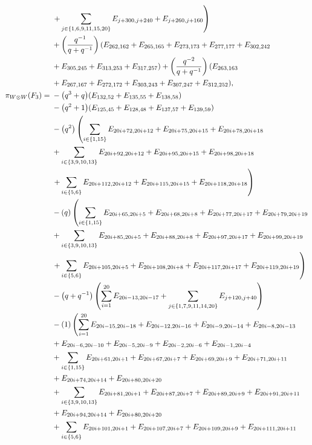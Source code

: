 \documentclass[pdftex]{sigma}
\numberwithin{equation}{section}
\theoremstyle{definition}
\begin{document}
\begin{align*}
&\left. + \sum_{j \in \{1,6,9,11,15,20\}} E_{j+300,j+240} + E_{j+260,j+160} \right) \\
&+\left(\frac{q^{-1}}{q + q^{-1}}\right)(E_{262,162}+E_{265,165}+E_{273,173}+E_{277,177}+E_{302,242}\\
&+E_{305,245}+E_{313,253}+E_{317,257})+\left(\frac{q^{-2}}{q + q^{-1}}\right)(E_{263,163}\\
&+E_{267,167}+E_{272,172}+E_{303,243}+E_{307,247}+E_{312,252}),
\\
 \pi_{W \otimes W}(F_3) ={}&
-\bigl(q^3 + q\bigr)(E_{132,52}+E_{135,55}+E_{138,58})\\
&-\bigl(q^2 + 1\bigr)(E_{125,45}+E_{128,48}+E_{137,57}+E_{139,59})\\
&-\bigl(q^2\bigr)\left( \sum_{i \in \{1,15\}} E_{20i+72,20i+12} + E_{20i+75,20i+15} + E_{20i+78,20i+18} \right.\\
&+ \sum_{i \in \{3,9,10,13\}} E_{20i+92,20i+12} + E_{20i+95,20i+15} + E_{20i+98,20i+18} \\
&\left.+ \sum_{i \in \{5,6\}} E_{20i+112,20i+12} + E_{20i+115,20i+15} + E_{20i+118,20i+18} \right)\\
&-(q)\left( \sum_{i \in \{1,15\}} E_{20i+65,20i+5} + E_{20i+68,20i+8} + E_{20i+77,20i+17} + E_{20i+79,20i+19} \right.\\
&+ \sum_{i \in \{3,9,10,13\}} E_{20i+85,20i+5} + E_{20i+88,20i+8} + E_{20i+97,20i+17} + E_{20i+99,20i+19} \\
&\left. + \sum_{i \in \{5,6\}} E_{20i+105,20i+5} + E_{20i+108,20i+8} + E_{20i+117,20i+17} + E_{20i+119,20i+19} \right)\\
&-\bigl(q+q^{-1}\bigr)\left( \sum_{i=1}^{20} E_{20i-13,20i-17} \vphantom{\sum_{j \in \{1,7,9,11,14,20\}}} + \sum_{j \in \{1,7,9,11,14,20\}} E_{j+120,j+40} \right)\\
&-(1)\left( \sum_{i=1}^{20} E_{20i-15,20i-18} + E_{20i-12,20i-16} + E_{20i-9,20i-14} + E_{20i-8,20i-13} \right.\\
&+ E_{20i-6,20i-10} + E_{20i-5,20i-9} + E_{20i-2,20i-6} + E_{20i-1,20i-4} \\
&+ \sum_{i \in \{1,15\}} E_{20i+61,20i+1} + E_{20i+67,20i+7} + E_{20i+69,20i+9} + E_{20i+71,20i+11} \\
&+ E_{20i+74,20i+14}+ E_{20i+80,20i+20} \\
&+ \sum_{i \in \{3,9,10,13\}} E_{20i+81,20i+1} + E_{20i+87,20i+7} + E_{20i+89,20i+9} + E_{20i+91,20i+11} \\
& + E_{20i+94,20i+14}+ E_{20i+80,20i+20} \\
&+ \sum_{i \in \{5,6\}} E_{20i+101,20i+1} + E_{20i+107,20i+7} + E_{20i+109,20i+9} + E_{20i+111,20i+11} \\

\end{align*}
\end{document}
